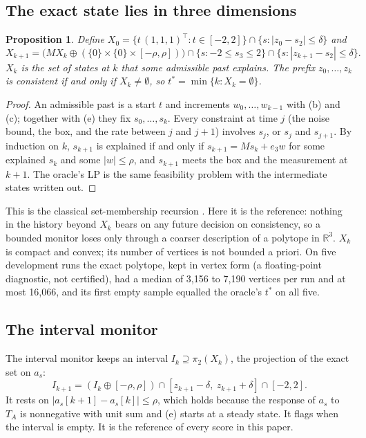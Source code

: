 \documentclass[11pt,a4paper]{article}
\newtheorem{proposition}{Proposition}
\newcommand{\tstar}{t^{\ast}}
\newcommand{\R}{\mathbb{R}}
\begin{document}
\subsection{The exact state lies in three dimensions}

\begin{proposition}\label{prop:info}
Define $X_0 = \{t\,(1,1,1)^\top : t\in[-2,2]\}\cap\{s : |z_0 - s_2|\le\delta\}$ and
\[
X_{k+1} = \bigl(M X_k\oplus(\{0\}\times\{0\}\times[-\rho,\rho])\bigr)\cap\{s : -2\le s_3\le 2\}\cap\{s : |z_{k+1}-s_2|\le\delta\}.
\]
$X_k$ is the set of states at $k$ that some admissible past explains. The prefix $z_0,\dots,z_k$ is consistent if and
only if $X_k\ne\emptyset$, so $\tstar = \min\{k : X_k = \emptyset\}$.
\end{proposition}
\begin{proof}
An admissible past is a start $t$ and increments $w_0,\dots,w_{k-1}$ with (b) and (c); together with (e) they fix
$s_0,\dots,s_k$. Every constraint at time $j$ (the noise bound, the box, and the rate between $j$ and $j+1$) involves
$s_j$, or $s_j$ and $s_{j+1}$. By induction on $k$, $s_{k+1}$ is explained if and only if $s_{k+1} = M s_k + e_3 w$ for
some explained $s_k$ and some $|w|\le\rho$, and $s_{k+1}$ meets the box and the measurement at $k+1$. The oracle's LP is
the same feasibility problem with the intermediate states written out.
\end{proof}

This is the classical set-membership recursion \citep{witsenhausen1968,schweppe1968,bertsekas1971}. Here it is the
reference: nothing in the history beyond $X_k$ bears on any future decision on consistency, so a bounded monitor loses
only through a coarser description of a polytope in $\R^3$. $X_k$ is compact and convex; its number of vertices is not
bounded a priori. On five development runs the exact polytope, kept in vertex form (a floating-point diagnostic, not
certified), had a median of 3,156 to 7,190 vertices per run and at most 16,066, and its first empty sample equalled the
oracle's $\tstar$ on all five.

\subsection{The interval monitor}\label{sec:im}

The interval monitor keeps an interval $I_k\supseteq\pi_2(X_k)$, the projection of the exact set on $a_s$:
\[
I_{k+1} = (I_k\oplus[-\rho,\rho])\cap[z_{k+1}-\delta,\ z_{k+1}+\delta]\cap[-2,2].
\]
It rests on $|a_s[k+1]-a_s[k]|\le\rho$, which holds because the response of $a_s$ to $T_A$ is nonnegative with unit sum
and (e) starts at a steady state. It flags when the interval is empty. It is the reference of every score in this
paper.
\end{document}
